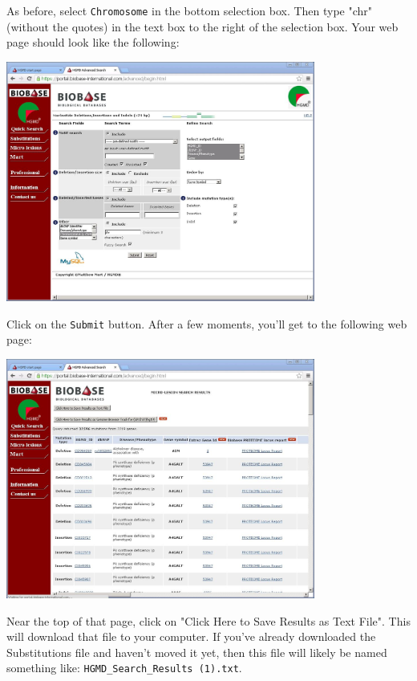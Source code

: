 \documentclass[11pt,titlepage,a4paper]{article}
\begin{document}
As before, select \texttt{Chromosome} in the bottom selection box. Then type "chr" (without the quotes) in the text box to the right of the selection box. Your web page should look like the following:

\begin{center}
\includegraphics[width=4in]{advancedindelchr.JPG}
\end{center}

Click on the \texttt{Submit} button. After a few moments, you'll get to the following web page:

\begin{center}
\includegraphics[width=4in]{advancedindelchrresults.JPG}
\end{center}

Near the top of that page, click on "Click Here to Save Results as Text File". This will download that file to your computer. If you've already downloaded the Substitutions file and haven't moved it yet, then this file will likely be named something like: \texttt{HGMD\_Search\_Results (1).txt}.
\end{document}

